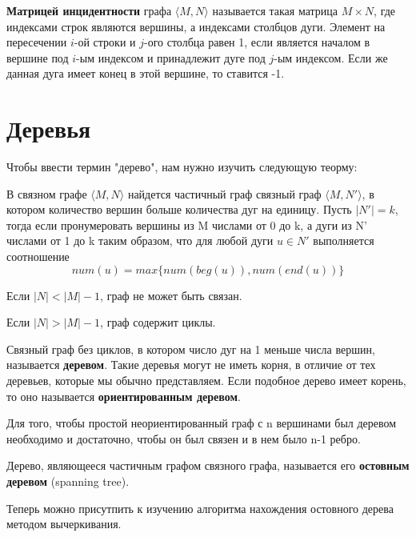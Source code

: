 \textbf{Матрицей инцидентности} графа $\langle M, N\rangle$ называется такая матрица $M \times N$, 
где индексами строк являются вершины, а индексами столбцов дуги. Элемент на пересечении $i$-ой строки и $j$-ого
столбца равен 1, если является началом в вершине под $i$-ым индексом и принадлежит дуге под $j$-ым индексом. Если же данная
дуга имеет конец в этой вершине, то ставится -1.

\section{Деревья}
Чтобы ввести термин "дерево", нам нужно изучить следующую теорму:
\begin{thm}
    В связном графе $\langle M, N \rangle$ найдется частичный граф связный граф
    $\langle M, N' \rangle$, в котором количество вершин больше количества дуг на единицу. Пусть $|N'| = k$, 
    тогда если пронумеровать вершины из M числами от 0 до k, а дуги из N' числами от 1 до k
    таким образом, что для любой дуги $u \in N'$ выполняется соотношение
    \begin{equation}
        num(u) = max\{num(beg(u)), num(end(u))\}
    \end{equation}
\end{thm}
\begin{sle}
    Если $|N| < |M| - 1$, граф не может быть связан.
\end{sle}
\begin{sle}
    Если $|N| > |M| - 1$, граф содержит циклы.
\end{sle}

Связный граф без циклов, в котором число дуг на 1 меньше числа вершин, называется
\textbf{деревом}. Такие деревья могут не иметь корня, в отличие от тех деревьев,
которые мы обычно представляем. Если подобное дерево имеет корень, то оно называется 
\textbf{ориентированным деревом}.

\begin{thm}
    Для того, чтобы простой неориентированный граф с n вершинами был деревом необходимо 
    и достаточно, чтобы он был связен  и в нем было n-1 ребро.
\end{thm}
Дерево, являющееся частичным графом связного графа, называется его \textbf{остовным деревом} (spanning tree).

Теперь можно присутпить к изучению алгоритма нахождения остовного дерева методом вычеркивания.

\hspace{5mm}
\newpage

